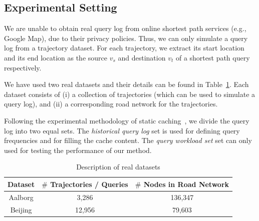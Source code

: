 



\subsection{Experimental Setting}
%
We are unable to obtain real query log from online shortest path services (e.g., Google Map), due to their privacy policies.
Thus, we can only simulate a query log from a trajectory dataset.
For each trajectory, we extract its start location and its end location as the
source $v_s$ and destination $v_t$ of a shortest path query respectively.

We have used two real datasets and their details can be found in Table~\ref{tab:datasetsize}.
Each dataset consists of (i) a collection of trajectories (which can be used to simulate a query log), and 
(ii) a corresponding road network for the trajectories.






Following the experimental methodology of static caching~\cite{Ozcan2011},
we divide the query log into two equal sets.
The {\em historical query log} set is used for defining query frequencies and
for filling the cache content.
The {\em query workload set} set can only used for testing the performance of our method.




\begin{table}
\center
\begin{tabular}{|c|c|c|}\hline
Dataset & $\#$ Trajectories / Queries & $\#$ Nodes in Road Network \\\hline
Aalborg & 3,286  & 136,347 \\\hline
Beijing & 12,956 & 79,603 \\\hline
\end{tabular}
\caption{Description of real datasets}
\label{tab:datasetsize}
\end{table}


